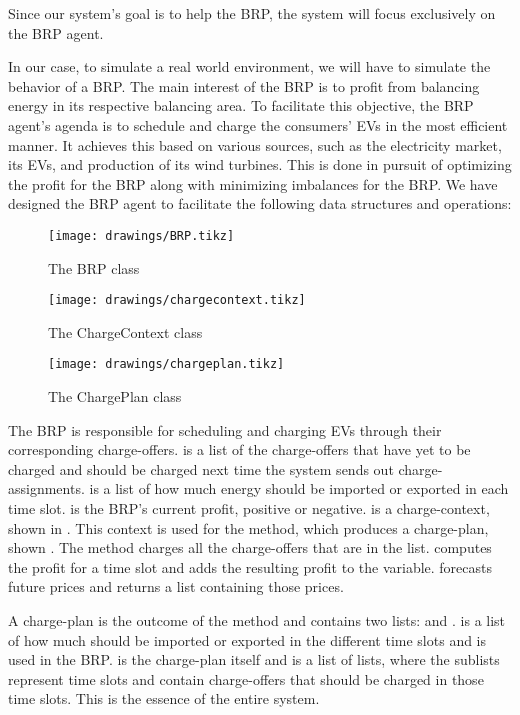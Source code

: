 Since our system's goal is to help the BRP, the system will focus exclusively on the BRP agent.

In our case, to simulate a real world environment, we will have to simulate the behavior of a BRP. The main interest of the BRP is to profit from balancing energy in its respective balancing area. To facilitate this objective, the BRP agent's agenda is to schedule and charge the consumers' EVs in the most efficient manner. It achieves this based on various sources, such as the electricity market, its EVs, and production of its wind turbines. This is done in pursuit of optimizing the profit for the BRP along with minimizing imbalances for the BRP. We have designed the BRP agent to facilitate the following data structures and operations: 

\begin{figure}[!htb]
  \centering
  \texttt{[image: drawings/BRP.tikz]}
  \caption{The BRP class}
  \label{fig:UMLBRP}
  	\begin{minipage}[t]{0.49\textwidth}
  		\centering
  		\texttt{[image: drawings/chargecontext.tikz]}
  		\caption{The ChargeContext class}\label{fig:UMLCC}
  	\end{minipage}
  	\begin{minipage}[t]{0.49\textwidth}
  		\centering
  		\texttt{[image: drawings/chargeplan.tikz]}
  		\caption{The ChargePlan class}\label{fig:UMLCP}
  	\end{minipage}
\end{figure}

The BRP is responsible for scheduling and charging EVs through their corresponding charge-offers.  is a list of the charge-offers that have yet to be charged and should be charged next time the system sends out charge-assignments.  is a list of how much energy should be imported or exported in each time slot.  is the BRP's current profit, positive or negative.  is a charge-context, shown in . This context is used for the  method, which produces a charge-plan, shown . The  method charges all the charge-offers that are in the  list.  computes the profit for a time slot and adds the resulting profit to the  variable.  forecasts future prices and returns a list containing those prices.

A charge-plan is the outcome of the  method and contains two lists:  and .  is a list of how much should be imported or exported in the different time slots and is used in the BRP.  is the charge-plan itself and is a list of lists, where the sublists represent time slots and contain charge-offers that should be charged in those time slots. This is the essence of the entire system.

